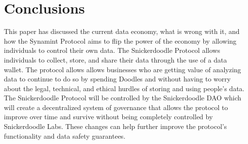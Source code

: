 \section{Conclusions}
This paper has discussed the current data economy, what is wrong with it, and how the Synamint Protocol aims to flip the power of the economy by allowing individuals to control their own data. The Snickerdoodle Protocol allows individuals to collect, store, and share their data through the use of a data wallet. The protocol allows allows businesses who are getting value of analyzing data to continue to do so by spending Doodles and without having to worry about the legal, technical, and ethical hurdles of storing and using people's data. The Snickerdoodle Protocol will be controlled by the Snickerdoodle DAO which will create a decentralized system of governance that allows the protocol to improve over time and survive without being completely controlled by Snickerdoodle Labs. These changes can help further improve the protocol's functionality and data safety guarantees. 